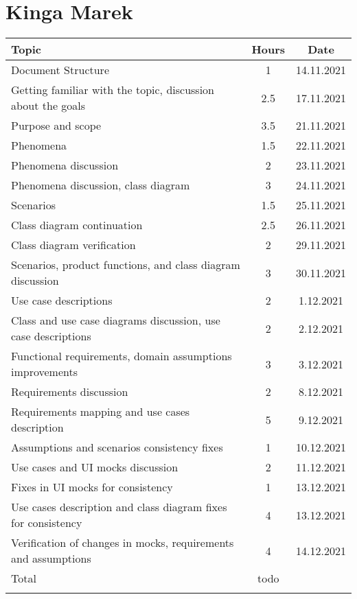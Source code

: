\section*{Kinga Marek}
\begin{table}[H]
    \centering
    \begin{tabular}{lcc} \Xhline{1.5pt}
        Topic &  Hours & Date \\ \hline
        Document Structure & 1 & 14.11.2021 \\ 
        Getting familiar with the topic, discussion about the goals & 2.5 & 17.11.2021 \\ 
        Purpose and scope & 3.5 & 21.11.2021 \\
        Phenomena & 1.5 & 22.11.2021 \\ 
        Phenomena discussion & 2 & 23.11.2021 \\
        Phenomena discussion, class diagram & 3 & 24.11.2021 \\ 
        Scenarios & 1.5 & 25.11.2021 \\ 
        Class diagram continuation & 2.5 & 26.11.2021 \\
        Class diagram verification & 2 & 29.11.2021 \\
        Scenarios, product functions, and class diagram discussion & 3 & 30.11.2021\\ 
        Use case descriptions & 2 & 1.12.2021\\
        Class and use case diagrams discussion, use case descriptions & 2 & 2.12.2021\\
        Functional requirements, domain assumptions improvements & 3 & 3.12.2021\\
        Requirements discussion & 2 & 8.12.2021\\
        Requirements mapping and use cases description & 5 & 9.12.2021\\
        Assumptions and scenarios consistency fixes & 1 & 10.12.2021\\
        Use cases and UI mocks discussion & 2 & 11.12.2021\\
        Fixes in UI mocks for consistency & 1 & 13.12.2021\\
        Use cases description and class diagram fixes for consistency & 4 & 13.12.2021\\
        Verification of changes in mocks, requirements and assumptions & 4 & 14.12.2021\\
        \hline
        Total & todo & \\ \Xhline{1.5pt}
    \end{tabular}
\end{table}